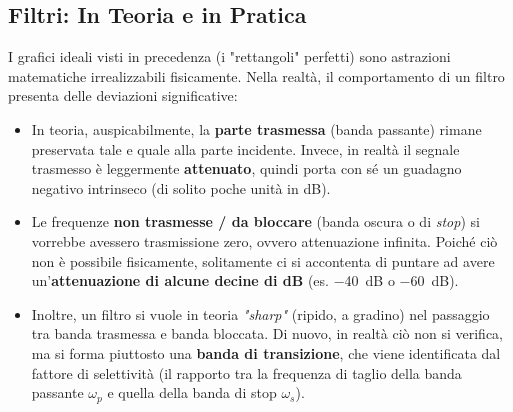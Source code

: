 \documentclass[openany,a4paper,12pt]{book}
\begin{document}
\subsection*{Filtri: In Teoria e in Pratica}

I grafici ideali visti in precedenza (i "rettangoli" perfetti) sono astrazioni matematiche irrealizzabili fisicamente. Nella realtà, il comportamento di un filtro presenta delle deviazioni significative:

\begin{itemize}[label=\textcolor{PoliBlue}{\textbullet}]
    \item In teoria, auspicabilmente, la \textbf{parte trasmessa} (banda passante) rimane preservata tale e quale alla parte incidente. Invece, in realtà il segnale trasmesso è leggermente \textbf{attenuato}, quindi porta con sé un guadagno negativo intrinseco (di solito poche unità in dB).
    \item Le frequenze \textbf{non trasmesse / da bloccare} (banda oscura o di \textit{stop}) si vorrebbe avessero trasmissione zero, ovvero attenuazione infinita. Poiché ciò non è possibile fisicamente, solitamente ci si accontenta di puntare ad avere un'\textbf{attenuazione di alcune decine di dB} (es. \qty{-40}{\deci\bel} o \qty{-60}{\deci\bel}).
    \item Inoltre, un filtro si vuole in teoria \textit{"sharp"} (ripido, a gradino) nel passaggio tra banda trasmessa e banda bloccata. Di nuovo, in realtà ciò non si verifica, ma si forma piuttosto una \textbf{banda di transizione}, che viene identificata dal fattore di selettività (il rapporto tra la frequenza di taglio della banda passante $\omega_p$ e quella della banda di stop $\omega_s$).
\end{itemize}

\end{document}
